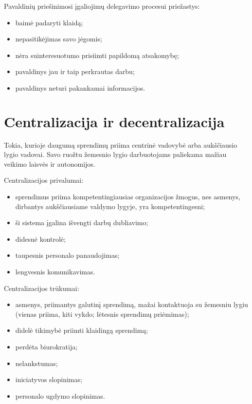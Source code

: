Pavaldinių priešinimosi įgaliojimų delegavimo procesui priežastys:
\begin{itemize}
  \item baimė padaryti klaidą;
  \item nepasitikėjimas savo jėgomis;
  \item nėra suinteresuotumo prisiimti papildomą atsakomybę;
  \item pavaldinys jau ir taip perkrautas darbu;
  \item pavaldinys neturi pakankamai informacijos.
\end{itemize}

\section{Centralizacija ir decentralizacija}

\begin{defn}
  Tokia, kurioje daugumą sprendimų priima centrinė vadovybė arba
  aukščiausio lygio vadovai. Savo ruožtu žemesnio lygio darbuotojams
  paliekama mažiau veikimo laisvės ir autonomijos.
\end{defn}

Centralizacijos privalumai:
\begin{itemize}
  \item sprendimus priima kompetentingiausias organizacijos žmogus, nes
    asmenys, dirbantys aukščiausiame valdymo lygyje, yra kompetentingesni;
  \item ši sistema įgalina išvengti darbų dubliavimo;
  \item didesnė kontrolė;
  \item taupesnis personalo panaudojimas;
  \item lengvesnis komunikavimas.
\end{itemize}

Centralizacijos trūkumai:
\begin{itemize}
  \item asmenys, priimantys galutinį sprendimą, mažai kontaktuoja su
    žemesniu lygiu (vienas priima, kiti vykdo; lėtesnis sprendimų
    priėmimas);
  \item didelė tikimybė priimti klaidingą sprendimą;
  \item perdėta biurokratija;
  \item nelankstumas;
  \item iniciatyvos slopinimas;
  \item personalo ugdymo slopinimas.
\end{itemize}


